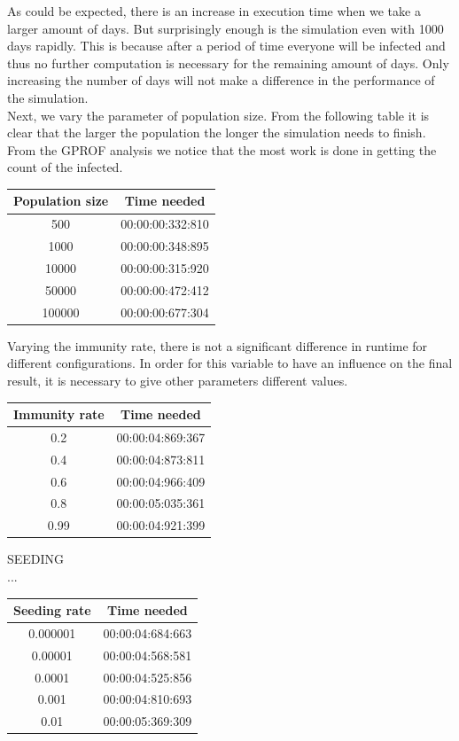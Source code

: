 \documentclass[runningheads]{llncs}
\begin{document}
As could be expected, there is an increase in execution time when we take a larger amount of days. But surprisingly enough is the simulation even with 1000 days rapidly. This is because after a period of time everyone will be infected and thus no further computation is necessary for the remaining amount of days. Only increasing the number of days will not make a difference in the performance of the simulation.\\

Next, we vary the parameter of population size. From the following table it is clear that the larger the population the longer the simulation needs to finish. From the GPROF analysis we notice that the most work is done in getting the count of the infected.

\begin{center}
	\begin{tabular}{ | c | c |}
		\hline
		Population size & Time needed \\ \hline
		500 & 00:00:00:332:810 \\ \hline
		1000 & 00:00:00:348:895 \\ \hline
		10000 & 00:00:00:315:920 \\ \hline
		50000 & 00:00:00:472:412 \\ \hline
		100000 & 00:00:00:677:304 \\
		\hline	
	\end{tabular}
\end{center} 
 

Varying the immunity rate, there is not a significant difference in runtime for different configurations. In order for this variable to have an influence on the final result, it is necessary to give other parameters different values.

\begin{center}
	\begin{tabular}{ | c | c |}
		\hline
		Immunity rate & Time needed \\ \hline
		0.2 & 00:00:04:869:367 \\ \hline
		0.4 & 00:00:04:873:811 \\ \hline
		0.6 & 00:00:04:966:409 \\ \hline
		0.8 & 00:00:05:035:361 \\ \hline
		0.99 & 00:00:04:921:399 \\
		\hline	
	\end{tabular}
\end{center} 


SEEDING\\...
\begin{center}
	\begin{tabular}{ | c | c |}
		\hline
		Seeding rate & Time needed \\ \hline
		0.000001 & 00:00:04:684:663 \\ \hline
		0.00001 & 00:00:04:568:581 \\ \hline
		0.0001 & 00:00:04:525:856 \\ \hline
		0.001 & 00:00:04:810:693 \\ \hline
		0.01 & 00:00:05:369:309 \\
		\hline	
	\end{tabular}
\end{center} 
\end{document}
